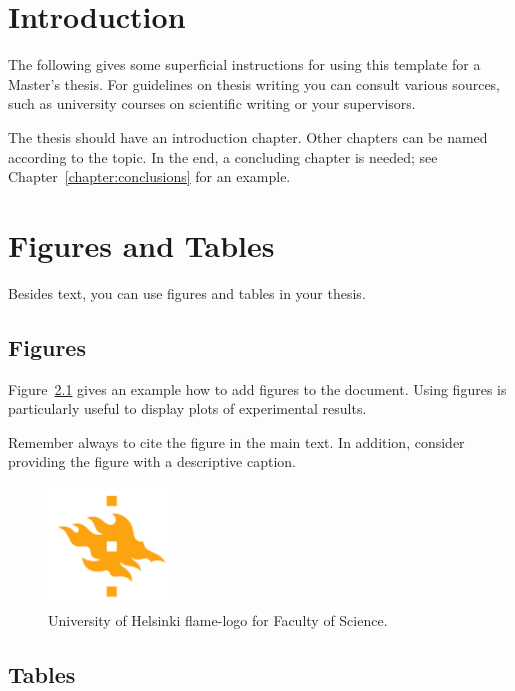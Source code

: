 \chapter{Introduction}

The following gives some superficial instructions for using this template for a Master's thesis. For guidelines on thesis writing you can consult various sources, such as university courses on scientific writing or your supervisors.

The thesis should have an introduction chapter. Other chapters can be named according to the topic. In the end, a concluding chapter is needed; see Chapter~\ref{chapter:conclusions} for an example.

\chapter{Figures and Tables}

Besides text, you can use figures and tables in your thesis.

\section{Figures}
Figure~\ref{fig:logo} gives an example how to add figures to the document. 
%
Using figures is particularly useful to display plots of experimental results.

Remember always to cite the figure in the main text. In addition, consider providing the figure with a descriptive caption.

\begin{figure}[h!] 
\begin{center}
\includegraphics[width=0.3\textwidth]{template/figures/HY-logo-ml.png}
\caption{University of Helsinki flame-logo for Faculty of Science.\label{fig:logo}}
\end{center}
\end{figure}

\section{Tables}


